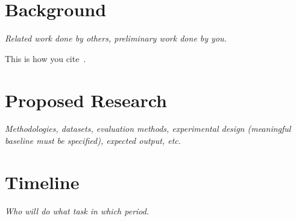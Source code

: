 \documentclass[10pt]{article}
\begin{document}
\section{Background}

\textit{Related work done by others, preliminary work done by you.}

\noindent This is how you cite~\cite{choi:16a}.



\section{Proposed Research}

\textit{Methodologies, datasets, evaluation methods, experimental design (meaningful baseline must be specified), expected output, etc.}

\section{Timeline}

\textit{Who will do what task in which period.}




\end{document}
